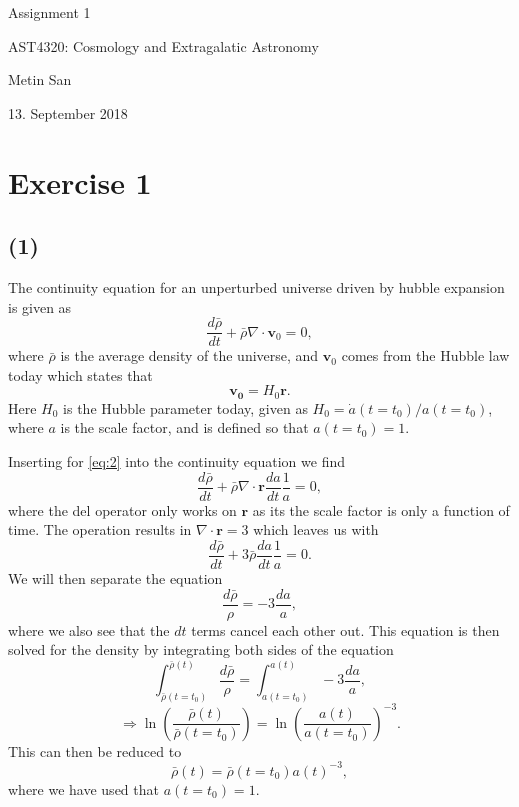 \documentclass[a4paper]{article}
\begin{document}
\vspace*{2cm}
\begin{center} 
 
\huge{Assignment 1}

\vspace{15mm}

\large{AST4320: Cosmology and Extragalatic Astronomy}

\vspace{5mm}

\normalsize{Metin San}

\vspace{5mm}

\normalsize{13. September 2018}

\vspace{25mm}

\end{center}

\newpage
\section*{Exercise 1}
\subsection*{(1)}

The continuity equation for an unperturbed universe driven by hubble expansion is given as 
\begin{equation}\label{eq:1}
\frac{d\bar{\rho}}{dt} + \bar{\rho} \nabla \cdot \mathbf{v}_0 = 0,
\end{equation}
where $\bar{\rho}$ is the average density of the universe, and $\mathbf{v}_0$ comes from the Hubble law today which states that 
\begin{equation}\label{eq:2}
\mathbf{v_0} = H_0 \mathbf{r}.
\end{equation}
Here $H_0$ is the Hubble parameter today, given as $H_0 = \dot{a}(t=t_0) / a(t = t_0)$, where $a$ is the scale factor, and is defined so that $a(t= t_0) = 1$. 

Inserting for \eqref{eq:2} into the continuity equation we find
\[
\frac{d\bar{\rho}}{dt} + \bar{\rho} \nabla \cdot \mathbf{r}  \frac{da}{dt} \frac{1}{a}= 0,
\]
where the del operator only works on $\mathbf{r}$ as its the scale factor is only a function of time. The operation results in $\nabla \cdot \mathbf{r} = 3$ which leaves us with
\[
\frac{d\bar{\rho}}{dt} + 3\bar{\rho}\frac{da}{dt} \frac{1}{a} = 0.
\]
We will then separate the equation
\[
\frac{d\bar{\rho}}{\rho} = -3 \frac{da}{a},
\]
where we also see that the $dt$ terms cancel each other out. This equation is then solved for the density by integrating both sides of the equation
\[
\int_{\bar{\rho}(t=t_0)}^{\bar{\rho}(t)} \frac{d\bar{\rho}}{\rho} = \int_{a(t=t_0)}^{a(t)} -3 \frac{da}{a},
\]
\[
\Rightarrow \ln \left( \frac{\bar{\rho}(t)}{\bar{\rho}(t=t_0)}\right) = \ln \left( \frac{a(t)}{a(t=t_0)}\right)^{-3}.
\]
This can then be reduced to
\begin{equation}\label{eq:3}
\bar{\rho}(t) = \bar{\rho}(t=t_0)a(t)^{-3},
\end{equation}
where we have used that $a(t=t_0) = 1$.
\end{document}
